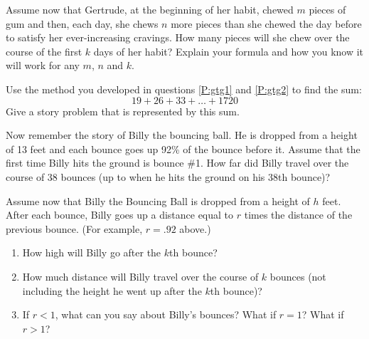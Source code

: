 \documentclass[justified,openany,nofonts]{tufte-book}
\begin{document}
\begin{prob}\label{P:gtg2}
Assume now that Gertrude, at the beginning of her habit, chewed $m$
pieces of gum and then, each day, she chews $n$ more pieces than she
chewed the day before to satisfy her ever-increasing cravings.  How many pieces will she chew over the course of the first $k$
  days of her habit? Explain your formula and how you know it will work for any $m$, $n$ and $k$.  
\end{prob}

\begin{prob}
Use the method you developed in questions \ref{P:gtg1} and
\ref{P:gtg2} to find the sum:
\[
19 + 26 + 33 + \dots + 1720
\]
Give a story problem that is represented by this sum.
\end{prob}

\begin{prob}
Now remember the story of Billy the bouncing ball.  He is dropped from a height of 13 feet and each bounce goes up 92\% of the bounce before it.  Assume that the first time Billy hits the ground is bounce \#1.  How far did Billy travel over the course of 38 bounces (up to when he hits the ground on his 38th bounce)?  
\end{prob}

\begin{prob}
Assume now that Billy the Bouncing Ball is dropped from a height of
$h$ feet. After each bounce, Billy goes up a distance equal to $r$
times the distance of the previous bounce. (For example, $r=.92$ above.)
\begin{enumerate}
\item How high will Billy go after the $k$th bounce?
\item How much distance will Billy travel over the course of $k$
  bounces (not including the height he went up after the $k$th
  bounce)?
\item If $r<1$, what can you say about Billy's bounces? What if $r=1$?
  What if $r>1$?
\end{enumerate}
\end{prob}
\end{document}
